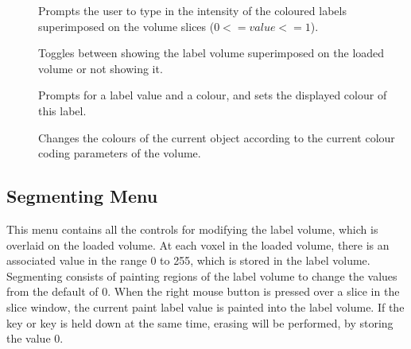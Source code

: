 \begin{description}
\item[]  Prompts the user to type in the
                      intensity of the coloured labels superimposed on the 
                      volume slices ($0 <= value <= 1$).
\item[]  Toggles between showing
                      the label volume superimposed on the loaded
                      volume or not showing it.
\item[]  Prompts for a
                      label value and a colour, and sets the displayed
                      colour of this label.
\item[]  Changes the
     colours of the current object according to the current colour
     coding parameters of the volume.
\end{description}

\subsection{Segmenting Menu}

This menu contains all the controls for modifying the label volume,
which is overlaid on the loaded volume.  At each voxel in the loaded
volume, there is an associated value in the range 0 to 255, which is
stored in the label volume.  Segmenting consists of painting regions
of the label volume to change the values from the default of 0.
When the right mouse button is pressed over a slice in the slice
window, the current paint label value is painted into the label
volume.  If the  key or  key is held down
at the same time, erasing will be performed, by storing the value 0.

